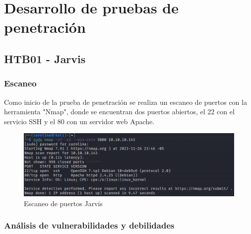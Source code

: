 \section{Desarrollo de pruebas de penetración}
\subsection{HTB01 - Jarvis}
    \subsubsection{Escaneo}
        \large{Como inicio de la prueba de penetración se realiza un escaneo de puertos con la herramienta "Nmap", donde se encuentran dos puertos abiertos, el 22 con el servicio SSH y el 80 con un servidor web Apache.}
        \par
        \begin{figure}[h!]
            \includegraphics[width=1\textwidth]{imagenes/nmap_jarvis.png} \par \vspace{0.1cm}
            \caption{Escaneo de puertos Jarvis} 
        \end{figure}
    \subsubsection{Análisis de vulnerabilidades y debilidades}
        